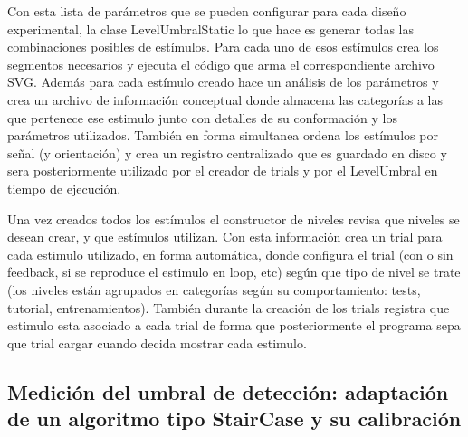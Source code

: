 \documentclass{article}
\begin{document}
    Con esta lista de parámetros que se pueden configurar para cada diseño experimental, la clase LevelUmbralStatic lo que hace es generar todas las combinaciones posibles de estímulos. Para cada uno de esos estímulos crea los segmentos necesarios y ejecuta el código que arma el correspondiente archivo SVG. Además para cada estímulo creado hace un análisis de los parámetros y crea un archivo de información conceptual donde almacena las categorías a las que pertenece ese estimulo junto con detalles de su conformación y los parámetros utilizados. También en forma simultanea ordena los estímulos por señal (y orientación) y crea un registro centralizado que es guardado en disco y sera posteriormente utilizado por el creador de trials y por el LevelUmbral en tiempo de ejecución.
    
    Una vez creados todos los estímulos el constructor de niveles revisa que niveles se desean crear, y que estímulos utilizan. Con esta información crea un trial para cada estimulo utilizado, en forma automática, donde configura el trial (con o sin feedback, si se reproduce el estimulo en loop, etc) según que tipo de nivel se trate (los niveles están agrupados en categorías según su comportamiento: tests, tutorial, entrenamientos). También durante la creación de los trials registra que estimulo esta asociado a cada trial de forma que posteriormente el programa sepa que trial cargar cuando decida mostrar cada estimulo. 
    
    \subsection{Medición del umbral de detección: adaptación de un algoritmo tipo StairCase y su calibración}
    
    
    
\end{document}
